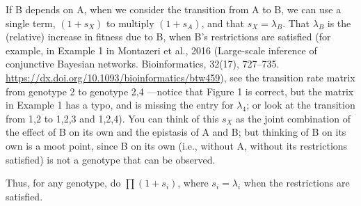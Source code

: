 \documentclass[11pt]{article}
\begin{document}
\begin{itemize}
If B depends on A, when we consider the transition from A to B, we can use a single term, \((1 + s_X)\) to multiply \((1 + s_A)\), and that \(s_X = \lambda_B\). That \(\lambda_B\) is the (relative) increase in fitness due to B, when B's restrictions are satisfied (for example, in Example 1 in Montazeri et al., 2016 (Large-scale inference of conjunctive Bayesian networks. Bioinformatics, 32(17), 727–735. \url{https://dx.doi.org/10.1093/bioinformatics/btw459}), see the transition rate matrix from genotype 2 to genotype 2,4 ---notice that Figure 1 is correct, but the matrix in Example 1 has a typo, and is missing the entry for \(\lambda_4\); or look at the transition from 1,2 to 1,2,3 and 1,2,4). You can think of this \(s_X\) as the joint combination of the effect of B on its own and the epistasis of A and B; but thinking of B on its own is a moot point, since B on its own (i.e., without A, without its restrictions satisfied) is not a genotype that can be observed. 

Thus, for any genotype, do \(\prod (1 + s_i)\), where \(s_i = \lambda_i\) when the restrictions are satisfied.
\end{itemize}
\end{document}
